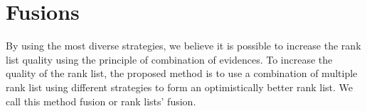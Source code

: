 \section{Fusions \label{sec:fusions}}

By using the most diverse strategies, we believe it is possible to increase the rank list quality using the principle of combination of evidences.
To increase the quality of the rank list, the proposed method is to use a combination of multiple rank list using different strategies to form an optimistically better rank list.
We call this method fusion or rank lists' fusion.





